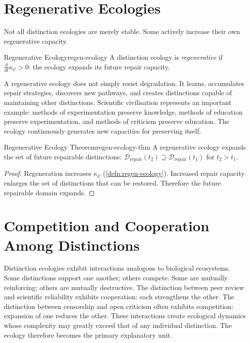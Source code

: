 \documentclass[12pt,twoside,openright]{book}
\begin{document}
\section{Regenerative Ecologies}
\label{sec:ch12-regen-ecologies}

Not all distinction ecologies are merely stable. Some
actively increase their own regenerative capacity.

\begin{definition}{Regenerative Ecology}{regen-ecology}
  A distinction ecology is \emph{regenerative} if
  $\frac{d}{dt}\kappa_\mathcal{E} > 0$: the ecology expands
  its future repair capacity.
\end{definition}

A regenerative ecology does not simply resist degradation.
It learns, accumulates repair strategies, discovers new
pathways, and creates distinctions capable of maintaining
other distinctions. Scientific civilisation represents an
important example: methods of experimentation preserve
knowledge, methods of education preserve experimentation,
and methods of criticism preserve education. The ecology
continuously generates new capacities for preserving
itself.

\begin{theorem}{Regenerative Ecology Theorem}{regen-ecology-thm}
  A regenerative ecology expands the set of future
  repairable distinctions:
  $\mathcal{D}_\mathrm{repair}(t_2) \supseteq
  \mathcal{D}_\mathrm{repair}(t_1)$ for $t_2 > t_1$.
\end{theorem}

\begin{proof}
  Regeneration increases $\kappa_\mathcal{E}$
  (\cref{defn:regen-ecology}). Increased repair capacity
  enlarges the set of distinctions that can be restored.
  Therefore the future repairable domain expands.
\end{proof}

\section{Competition and Cooperation Among Distinctions}
\label{sec:ch12-competition}

Distinction ecologies exhibit interactions analogous to
biological ecosystems. Some distinctions support one
another; others compete. Some are mutually reinforcing;
others are mutually destructive. The distinction between
peer review and scientific reliability exhibits cooperation:
each strengthens the other. The distinction between
censorship and open criticism often exhibits competition:
expansion of one reduces the other. These interactions
create ecological dynamics whose complexity may greatly
exceed that of any individual distinction. The ecology
therefore becomes the primary explanatory unit.
\end{document}
